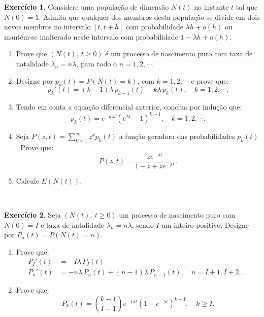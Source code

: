 \documentclass[
  11pt,
  a4paper,
]{book}
\theoremstyle{definition}
\theoremstyle{definition}
\theoremstyle{definition}
\newtheorem{exercise}{Exercício}[chapter]
\theoremstyle{definition}
\theoremstyle{remark}
\begin{document}
\begin{exercise}
\leavevmode

Considere uma população de dimensão \(N(t)\) no instante \(t\) tal que \(N(0) = 1\). Admita que qualquer dos membros desta população se divide em dois novos membros no intervalo \([t, t+h]\) com probabilidade \(\lambda h + o(h)\) ou mantém-se inalterado neste intervalo com probabilidade \(1 - \lambda h + o(h)\).

\begin{enumerate}
\def\labelenumi{(\alph{enumi})}
\item
  Prove que \((N(t), ~ t \geq 0)\) é um processo de nascimento puro com taxa de natalidade \(\lambda_n = n \lambda\), para todo o \(n = 1, 2, \cdots\).
\item
  Designe por \(p_k(t) = P(N(t) = k)\), com \(k = 1, 2, \cdots\) e prove que:
  \[
  p_k'(t) = (k-1)\lambda\, p_{k-1}(t) - k\lambda\, p_k(t), \quad k = 1,2,\cdots.
  \]
\item
  Tendo em conta a equação diferencial anterior, conclua por indução que:
  \[
  p_k(t) = e^{-k\lambda t} \left( e^{\lambda t} - 1 \right)^{k-1}, \quad k = 1,2,\cdots.
  \]
\item
  Seja \(P(z,t) = \sum\limits_{k=1}^{\infty} z^k p_k(t)\) a função geradora das probabilidades \(p_k(t)\). Prove que:
  \[
  P(z,t) = \frac{z e^{-\lambda t}}{1 - z + z e^{-\lambda t}}.
  \]
\item
  Calcule \(E(N(t))\).
\end{enumerate}

\end{exercise}

\(\,\)

\begin{exercise}
\leavevmode

Seja \((N(t), ~t \geq 0)\) um processo de nascimento puro com \(N(0) = I\) e taxa de natalidade \(\lambda_n = n \lambda\), sendo \(I\) um inteiro positivo. Designe por \(P_n(t) = P(N(t) = n)\).

\begin{enumerate}
\def\labelenumi{(\alph{enumi})}
\item
  Prove que:
  \begin{align*}
    P_I'(t) &= -I\lambda\, P_I(t) \\
    P_n'(t) &= -n\lambda\, P_n(t) + (n-1)\lambda\, P_{n-1}(t), \quad n = I+1, I+2, \ldots
  \end{align*}
\item
  Prove que:
  \[
  P_k(t) = \binom{k-1}{I-1} e^{-I\lambda t} \left( 1 - e^{-\lambda t} \right)^{k - I}, \quad k \geq I.
  \]
\end{enumerate}

\end{exercise}
\end{document}
